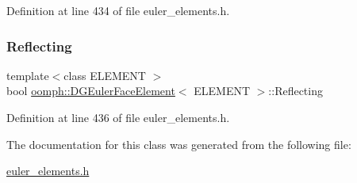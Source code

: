 Definition at line 434 of file euler\+\_\+elements.\+h.

\mbox{\label{classoomph_1_1DGEulerFaceElement_aaed16dc9edc6e846d8fc5f569bfa3044}} 
\subsubsection{\texorpdfstring{Reflecting}{Reflecting}}
{\footnotesize\ttfamily template$<$class E\+L\+E\+M\+E\+NT $>$ \\
bool \hyperlink{classoomph_1_1DGEulerFaceElement}{oomph\+::\+D\+G\+Euler\+Face\+Element}$<$ E\+L\+E\+M\+E\+NT $>$\+::Reflecting\hspace{0.3cm}{\ttfamily [private]}}



Definition at line 436 of file euler\+\_\+elements.\+h.



The documentation for this class was generated from the following file\+:\begin{DoxyCompactItemize}
\item 
\hyperlink{euler__elements_8h}{euler\+\_\+elements.\+h}\end{DoxyCompactItemize}
